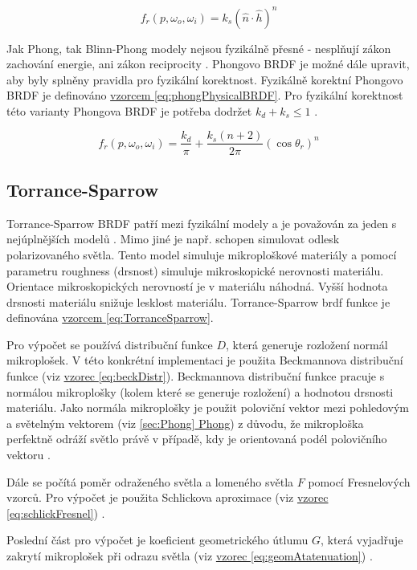 \documentclass[czech,master]{diploma}
\newcommand{\uvec}[1]{\hat{#1}}
\newcommand{\point}{p}
\newcommand{\brdf}{f_r\left(\point,\omega_{o},\omega_{i}\right)}
\newcommand{\normVec}{\uvec{n}}
\newcommand{\halfVec}{\uvec{h}}
\begin{document}
\begin{equation} \label{eq:blinnBRDF}
  \brdf = k_s(\normVec\cdot\halfVec)^n
\end{equation}

Jak Phong, tak Blinn-Phong modely nejsou fyzikálně přesné - nesplňují zákon zachování energie, ani zákon reciprocity \cite{BRDFOverview}. Phongovo BRDF je možné dále upravit, aby byly splněny pravidla pro fyzikální korektnost. Fyzikálně korektní Phongovo BRDF je definováno \hyperref[eq:phongPhysicalBRDF]{vzorcem \ref{eq:phongPhysicalBRDF}}. Pro fyzikální korektnost této varianty Phongova BRDF je potřeba dodržet \(k_d + k_s \leq 1\) \cite{LaFortunePhongBRDF}.

\begin{equation} \label{eq:phongPhysicalBRDF}
  \brdf = \frac{k_d}{\pi} +
  \frac{k_s\left(n+2\right)}{2\pi}\left(\cos\theta_r\right)^n
\end{equation}

\subsection{Torrance-Sparrow} \label{sec:torrancesparrow}
Torrance-Sparrow BRDF patří mezi fyzikální modely a je považován za jeden s nejúplnějších modelů \cite{BRDFOverview}. Mimo jiné je např. schopen simulovat odlesk polarizovaného světla. Tento model simuluje mikroploškové materiály a pomocí parametru roughness (drsnost) simuluje mikroskopické nerovnosti materiálu. Orientace mikroskopických nerovností je v materiálu náhodná. Vyšší hodnota drsnosti materiálu snižuje lesklost materiálu. Torrance-Sparrow brdf funkce je definována \hyperref[eq:TorranceSparrow]{vzorcem \ref{eq:TorranceSparrow}}. \par
Pro výpočet se používá distribuční funkce \(D\), která generuje rozložení normál mikroplošek. V této konkrétní implementaci je použita Beckmannova distribuční funkce (viz \hyperref[eq:beckDistr]{vzorec \ref{eq:beckDistr}}). Beckmannova distribuční funkce pracuje s normálou mikroplošky (kolem které se generuje rozložení) a hodnotou drsnosti materiálu. Jako normála mikroplošky je použit poloviční vektor mezi pohledovým a světelným vektorem (viz \hyperref[sec:Phong]{\ref{sec:Phong} Phong}) z důvodu, že mikroploška perfektně odráží světlo právě v případě, kdy je orientovaná podél polovičního vektoru \cite{PHARR2017507}. \par
Dále se počítá poměr odraženého světla a lomeného světla \(F\) pomocí Fresnelových vzorců. Pro výpočet je použita Schlickova aproximace (viz \hyperref[eq:schlickFresnel]{vzorec \ref{eq:schlickFresnel}}) \cite{SchlickFresnel}. \par
Poslední část pro výpočet je koeficient geometrického útlumu \(G\), která vyjadřuje zakrytí mikroplošek při odrazu světla (viz \hyperref[eq:geomAtatenuation]{vzorec \ref{eq:geomAtatenuation}}) \cite{BRDFOverview}.
\end{document}

